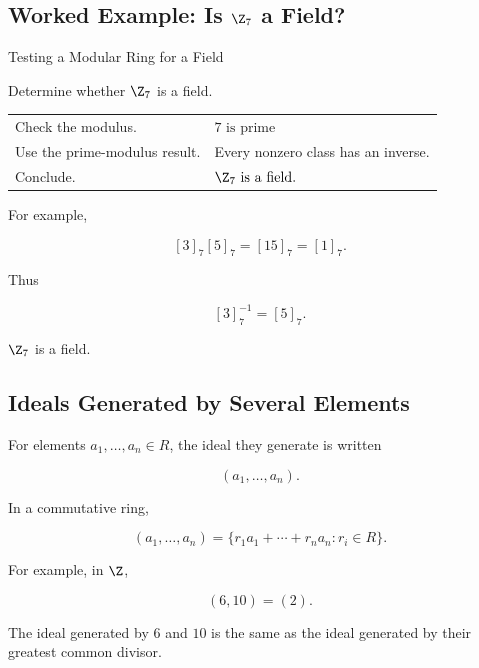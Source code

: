 \subsection{Worked Example: Is \(\Z_7\) a Field?}
\label{subsec:worked-z7-field}

\begin{workedexamplebox}{Testing a Modular Ring for a Field}

Determine whether \(\Z_7\) is a field.

\begin{tabularx}{\textwidth}{@{}>{\raggedright\arraybackslash}p{}X@{}}
Check the modulus. & \(7\text{ is prime}\)\\
Use the prime-modulus result. & Every nonzero class has an inverse.\\
Conclude. & \(\Z_7\text{ is a field.}\)
\end{tabularx}

For example,

\[ [3]_7[5]_7=[15]_7=[1]_7. \]

Thus

\[ [3]_7^{-1}=[5]_7. \]

\begin{answerbox}
\(\Z_7\) is a field.
\end{answerbox}
\end{workedexamplebox}

\subsection{Ideals Generated by Several Elements}
\label{subsec:multiple-generated-ideals}

For elements \(a_1,\ldots,a_n\in R\), the ideal they generate is written

\[ (a_1,\ldots,a_n). \]

In a commutative ring,

\[ (a_1,\ldots,a_n)=\{r_1a_1+\cdots+r_na_n:r_i\in R\}. \]

For example, in \(\Z\),

\[ (6,10)=(2). \]

The ideal generated by \(6\) and \(10\) is the same as the ideal generated by
their greatest common divisor.

